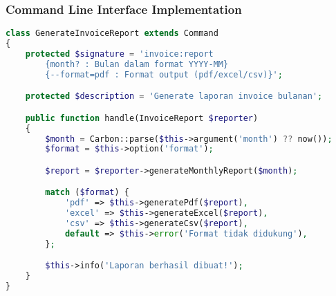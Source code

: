 \documentclass[a4paper]{report}
\begin{document}
\subsubsection{Command Line Interface Implementation}
\begin{lstlisting}[language=PHP]
class GenerateInvoiceReport extends Command
{
    protected $signature = 'invoice:report 
        {month? : Bulan dalam format YYYY-MM} 
        {--format=pdf : Format output (pdf/excel/csv)}';

    protected $description = 'Generate laporan invoice bulanan';

    public function handle(InvoiceReport $reporter)
    {
        $month = Carbon::parse($this->argument('month') ?? now());
        $format = $this->option('format');

        $report = $reporter->generateMonthlyReport($month);

        match ($format) {
            'pdf' => $this->generatePdf($report),
            'excel' => $this->generateExcel($report),
            'csv' => $this->generateCsv($report),
            default => $this->error('Format tidak didukung'),
        };

        $this->info('Laporan berhasil dibuat!');
    }
}
\end{lstlisting}
\end{document}
